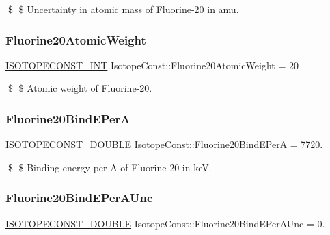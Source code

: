 \$ \$ Uncertainty in atomic mass of Fluorine-\/20 in amu. \mbox{\label{group___isotope_const-_fluorine-_f20_ga171b2b590fb7875bfb108a7ea2884d78}} 
\subsubsection{\texorpdfstring{Fluorine20\+Atomic\+Weight}{Fluorine20AtomicWeight}}
{\footnotesize\ttfamily \mbox{\hyperlink{group___isotope_const-_macros_ga5f18360b3e99483a35c32d789e62621c}{I\+S\+O\+T\+O\+P\+E\+C\+O\+N\+S\+T\+\_\+\+I\+NT}} Isotope\+Const\+::\+Fluorine20\+Atomic\+Weight = 20}

\$ \$ Atomic weight of Fluorine-\/20. \mbox{\label{group___isotope_const-_fluorine-_f20_gac43449c174431c6bf0924f19d6c88fe9}} 
\subsubsection{\texorpdfstring{Fluorine20\+Bind\+E\+PerA}{Fluorine20BindEPerA}}
{\footnotesize\ttfamily \mbox{\hyperlink{group___isotope_const-_macros_ga8f45a7272ce02c0b4c65c44636ed719a}{I\+S\+O\+T\+O\+P\+E\+C\+O\+N\+S\+T\+\_\+\+D\+O\+U\+B\+LE}} Isotope\+Const\+::\+Fluorine20\+Bind\+E\+PerA = 7720.}

\$ \$ Binding energy per A of Fluorine-\/20 in keV. \mbox{\label{group___isotope_const-_fluorine-_f20_ga00726d6fa91020ea80b1b63e979020de}} 
\subsubsection{\texorpdfstring{Fluorine20\+Bind\+E\+Per\+A\+Unc}{Fluorine20BindEPerAUnc}}
{\footnotesize\ttfamily \mbox{\hyperlink{group___isotope_const-_macros_ga8f45a7272ce02c0b4c65c44636ed719a}{I\+S\+O\+T\+O\+P\+E\+C\+O\+N\+S\+T\+\_\+\+D\+O\+U\+B\+LE}} Isotope\+Const\+::\+Fluorine20\+Bind\+E\+Per\+A\+Unc = 0.}

